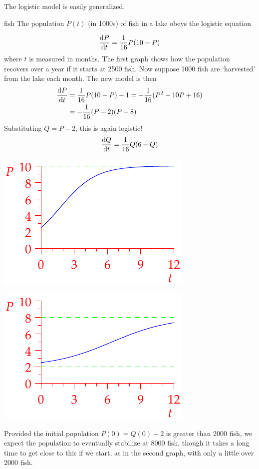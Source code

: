 The logistic model is easily generalized.

\begin{example}{}{fish}
The population $P(t)$ (in 1000s) of fish in a lake obeys the logistic equation
\begin{minipage}[t]{0.6\linewidth}\vspace{-10pt}
\[\diff[P]{t}=\frac 1{16}P(10-P)\]
where $t$ is measured in months. The first graph shows how the population recovers over a year if it starts at 2500 fish.\smallbreak
Now suppose 1000 fish are `harvested' from the lake each month. The new model is then
\begin{align*}
\diff[P]{t}&=\frac 1{16}P(10-P)-1=-\frac 1{16}(P^2-10P+16)\\
&=-\frac 1{16}(P-2)(P-8)
\end{align*}
Substituting $Q=P-2$, this is again logistic!
\[\diff[Q]{t}=\frac 1{16}Q(6-Q)\]
\end{minipage}\hfill\begin{minipage}[t]{0.39\linewidth}\vspace{0pt}
\flushright\includegraphics{fish}\par
\includegraphics{fish2}
\end{minipage}
Provided the initial population $P(0)=Q(0)+2$ is greater than 2000 fish, we expect the population to eventually stabilize at 8000 fish, though it takes a long time to get close to this if we start, as in the second graph, with only a little over 2000 fish.
\end{example}
\goodbreak



